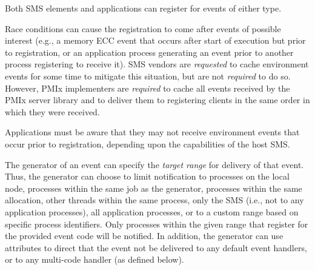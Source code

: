 Both \ac{SMS} elements and applications can register for events of either type.

\adviceimplstart
Race conditions can cause the registration to come after events of possible interest (e.g., a memory \ac{ECC} event that occurs after start of execution but prior to registration, or an application process generating an event prior to another process registering to receive it). \ac{SMS} vendors are \textit{requested} to cache environment events for some time to mitigate this situation, but are not \textit{required} to do so. However, \ac{PMIx} implementers are \textit{required} to cache all events received by the \ac{PMIx} server library and to deliver them to registering clients in the same order in which they were received.
\adviceimplend

\adviceuserstart
Applications must be aware that they may not receive environment events that occur prior to registration, depending upon the capabilities of the host \ac{SMS}.
\adviceuserend

The generator of an event can specify the \textit{target range} for delivery of that event. Thus, the generator can choose to limit notification to processes on the local node, processes within the same job as the generator, processes within the same allocation, other threads within the same process, only the \ac{SMS} (i.e., not to any application processes), all application processes, or to a custom range based on specific process identifiers. Only processes within the given range that register for the provided event code will be notified. In addition, the generator can use attributes to direct that the event not be delivered to any default event handlers, or to any multi-code handler (as defined below).

